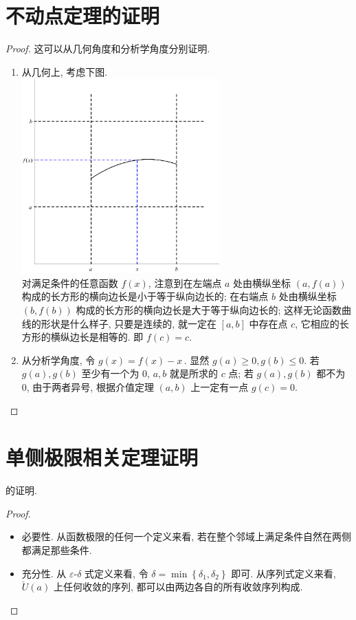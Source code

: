 \documentclass{book}
\newcommand{\set}[1]{\left\{#1\right\}}
\newcommand{\puncU}[1]{\check{U}\!\left( #1 \right)}
\renewcommand{\ge}{\geqslant}
\renewcommand{\le}{\leqslant}
\numberwithin{equation}{section}
\numberwithin{figure}{section}
\theoremstyle{definition}
\begin{document}
\section{不动点定理的证明}
\hypertarget{proof:budongdian}{}
\begin{proof}
  这可以从几何角度和分析学角度分别证明.
  \begin{enumerate}
    \item 从几何上, 考虑下图.\\
      \includegraphics[width=0.6\textwidth]{files/budongdian.pdf}\\
      对满足条件的任意函数 $f(x)$, 注意到在左端点 $a$ 处由横纵坐标 $(a,f(a))$ 构成的长方形的横向边长是小于等于纵向边长的; 在右端点 $b$ 处由横纵坐标 $(b,f(b))$ 构成的长方形的横向边长是大于等于纵向边长的; 这样无论函数曲线的形状是什么样子, 只要是连续的, 就一定在 $[a,b]$ 中存在点 $c$, 它相应的长方形的横纵边长是相等的. 即 $f(c)=c$.
    \item 从分析学角度, 令 $g(x)=f(x)-x$\,. 显然 $g(a)\ge0,g(b)\le0$. 若 $g(a),g(b)$ 至少有一个为 0, $a,b$ 就是所求的 $c$ 点; 若 $g(a),g(b)$ 都不为 0, 由于两者异号, 根据介值定理 $(a,b)$ 上一定有一点 $g(c)=0$.
  \end{enumerate}
\end{proof}

\section{单侧极限相关定理证明}
 的\hypertarget{proof:OneSideAndTwoSideLimit}{证明}.
\begin{proof}
  \leavevmode

  \begin{itemize}
    \item 必要性. 从函数极限的任何一个定义来看, 若在整个邻域上满足条件自然在两侧都满足那些条件.
    \item 充分性. 从 $\varepsilon$-$\delta$ 式定义来看, 令 $\delta=\min\set{\delta_1,\delta_2}$ 即可. 从序列式定义来看, $\puncU{a}$ 上任何收敛的序列, 都可以由两边各自的所有收敛序列构成.
  \end{itemize}
\end{proof}
\end{document}

